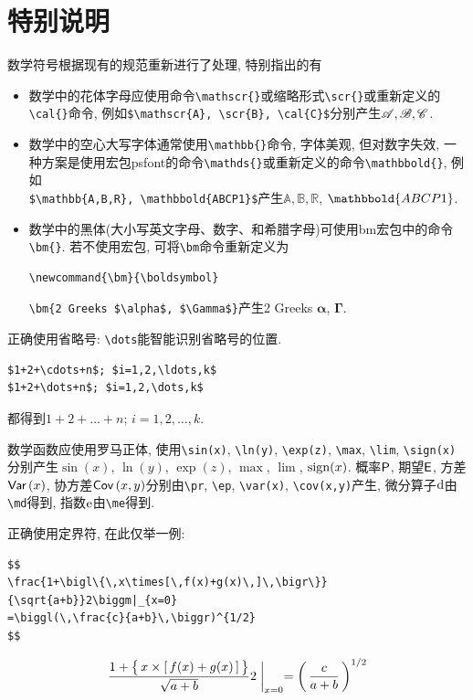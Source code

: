 \documentclass[a4paper,c5size,onecolumn,twoside,cap,Chinese]{APSart}
\begin{document}
\section{特别说明}

\begin{remark}
数学符号根据现有的规范重新进行了处理, 特别指出的有
\begin{itemize}
\item 数学中的花体字母应使用命令\verb|\mathscr{}|或缩略形式\verb|\scr{}|或重新定义的\verb|\cal{}|命令, 例如\verb|$\mathscr{A}, \scr{B}, \cal{C}$|分别产生$\mathscr{A}, \mathscr{B}, \mathscr{C}$.
\item 数学中的空心大写字体通常使用\verb|\mathbb{}|命令, 字体美观, 但对数字失效, 一种方案是使用宏包psfont的命令\verb|\mathds{}|或重新定义的命令\verb|\mathbbold{}|,
    例如 \\ \verb|$\mathbb{A,B,R}, \mathbbold{ABCP1}$|产生$\mathbb{A,B,R}$, $\mathbbold{ABCP1}$.
\item 数学中的黑体(大小写英文字母、数字、和希腊字母)可使用bm宏包中的命令\verb|\bm{}|. 若不使用宏包, 可将\verb|\bm|命令重新定义为
\begin{verbatim}
\newcommand{\bm}{\boldsymbol}
\end{verbatim}
\verb|\bm{2 Greeks $\alpha$, $\Gamma$}|产生2 Greeks $\bm{\alpha}$, $\bm{\Gamma}$.
\end{itemize}
\end{remark}

\begin{remark}
正确使用省略号: \verb|\dots|能智能识别省略号的位置.
\begin{verbatim}
$1+2+\cdots+n$; $i=1,2,\ldots,k$
$1+2+\dots+n$; $i=1,2,\dots,k$
\end{verbatim}
都得到$1+2+\dots+n$; $i=1,2,\dots,k$.
\end{remark}

\begin{remark}
数学函数应使用罗马正体, 使用\verb|\sin(x)|, \verb|\ln(y)|, \verb|\exp(z)|, \verb|\max|, \verb|\lim|, \verb|\sign(x)|分别产生$\sin(x)$, $\ln(y)$, $\exp(z)$, $\max$, $\lim$, $\mathrm{sign}(x)$. 概率$\hbox{\sf P}$, 期望$\hbox{\sf E}$, 方差$\hbox{\sf Var}\,(x)$, 协方差$\hbox{\sf Cov}\,(x,y)$分别由\verb|\pr|, \verb|\ep|, \verb|\var(x)|, \verb|\cov(x,y)|产生, 微分算子$\mathrm{d}$由\verb|\md|得到, 指数$\mathrm{e}$由\verb|\me|得到.
\end{remark}

\begin{remark}
正确使用定界符, 在此仅举一例:
\begin{verbatim}
$$
\frac{1+\bigl\{\,x\times[\,f(x)+g(x)\,]\,\bigr\}}{\sqrt{a+b}}2\biggm|_{x=0}
=\biggl(\,\frac{c}{a+b}\,\biggr)^{1/2}
$$
\end{verbatim}
$$
\frac{1+\bigl\{\,x\times[\,f(x)+g(x)\,]\,\bigr\}}{\sqrt{a+b}}2\biggm|_{x=0}
=\biggl(\,\frac{c}{a+b}\,\biggr)^{1/2}
$$
\end{remark}	
\end{document}
